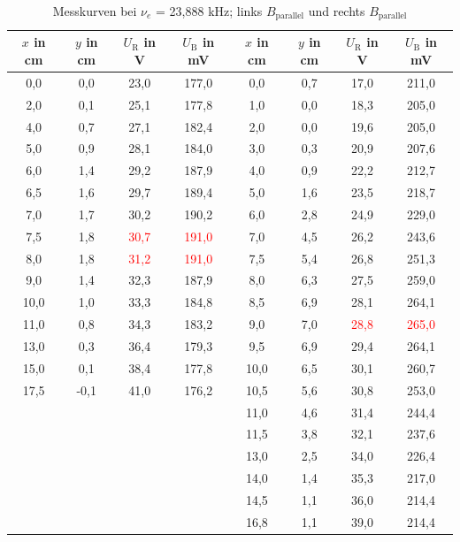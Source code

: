 \begin{table}[H]
 \begin{tabular}{c|c|c|c||c|c|c|c}
  $x$ in cm & $y$ in cm & $U_\text{R}$ in V & $U_\text{B} $ in mV & $x$ in cm & $y$ in cm & $U_\text{R}$ in V & $U_\text{B}$ in mV \\
 \hline
0,0 &	0,0&	23,0&	177,0&	0,0&	0,7&	17,0&	211,0\\
2,0&	0,1&	25,1&	177,8&	1,0&	0,0&	18,3&	205,0\\
4,0&	0,7&	27,1&	182,4&	2,0&	0,0&	19,6&	205,0\\
5,0&	0,9&	28,1&	184,0&	3,0&	0,3&	20,9&	207,6\\
6,0&	1,4&	29,2&	187,9&	4,0&	0,9&	22,2&	212,7\\
6,5&	1,6&	29,7&	189,4&	5,0&	1,6&	23,5&	218,7\\
7,0&	1,7&	30,2&	190,2&	6,0&	2,8&	24,9&	229,0\\
7,5&	1,8&	\textcolor{red}{30,7}&	\textcolor{red}{191,0}&	7,0&	4,5&	26,2&	243,6\\
8,0&	1,8&	\textcolor{red}{31,2}&	\textcolor{red}{191,0}&	7,5&	5,4&	26,8&	251,3\\
9,0&	1,4&	32,3&	187,9&	8,0&	6,3&	27,5&	259,0\\
10,0&	1,0&	33,3&	184,8&	8,5&	6,9&	28,1&	264,1\\
11,0&	0,8&	34,3&	183,2&	9,0&	7,0&	\textcolor{red}{28,8}&	\textcolor{red}{265,0}\\
13,0&	0,3&	36,4&	179,3&	9,5&	6,9&	29,4&	264,1\\
15,0&	0,1&	38,4&	177,8&	10,0&	6,5&	30,1&	260,7\\
17,5&	-0,1&	41,0&	176,2&	10,5&	5,6&	30,8&	253,0\\
&	&	&	&	11,0&	4,6&	31,4&	244,4\\
&	&	&	&	11,5&	3,8&	32,1&	237,6\\
&	&	&	&	13,0&	2,5&	34,0&	226,4\\
&	&	&	&	14,0&	1,4&	35,3&	217,0\\
&	&	&	&	14,5&	1,1&	36,0&	214,4\\
&	&	&	&	16,8&	1,1&	39,0&	214,4 \\

 \end{tabular}
 \caption{Messkurven bei $\nu_e$ = 23,888 kHz; links $B_\text{parallel}$ und rechts $B_\text{parallel}$}
 \label{tab_xAxisKalib24MHz}
\end{table}
